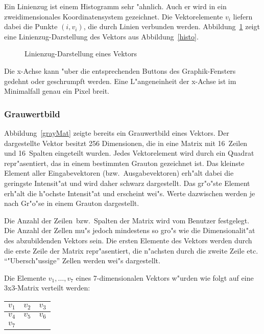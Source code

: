 Ein Linienzug ist einem Histogramm sehr "ahnlich. 
Auch er wird in ein zweidimensionales Koordinatensystem gezeichnet.
Die Vektorelemente $v_{i}$ liefern dabei die Punkte $(i,v_{i})$, die
durch Linien verbunden werden.
Abbildung~\ref{poly} zeigt eine Linienzug-Darstellung des Vektors aus
Abbildung~\ref{histo}.

\begin{figure}[ht]
\centerline{}
\caption{\label{poly} Linienzug-Darstellung eines Vektors}
\end{figure} 

Die x-Achse kann "uber die entsprechenden Buttons des Graphik-Fensters
gedehnt oder geschrumpft werden.
Eine L"angeneinheit der x-Achse ist im Minimalfall genau ein Pixel breit. 

\subsubsection*{Grauwertbild}

Abbildung~\ref{grayMat} zeigte bereits ein Grauwertbild eines Vektors.
Der dargestellte Vektor besitzt 256 Dimensionen, die in eine Matrix
mit 16~Zeilen und 16~Spalten eingeteilt wurden.
Jedes Vektorelement wird durch ein Quadrat repr"asentiert, das in einem
bestimmten Grauton gezeichnet ist.
Das kleinste Element aller Eingabevektoren (bzw.~Ausgabevektoren)
erh"alt dabei die geringste Intensit"at und wird daher schwarz dargestellt.
Das gr"o"ste Element erh"alt die h"ochste Intensit"at und erscheint wei"s.
Werte dazwischen werden je nach Gr"o"se in einem Grauton dargestellt. 

Die Anzahl der Zeilen~bzw.~Spalten der Matrix wird vom Benutzer festgelegt. 
Die Anzahl der Zellen mu"s jedoch mindestens so gro"s wie die Dimensionalit"at
des abzubildenden Vektors sein.
Die ersten Elemente des Vektors werden durch die erste Zeile der Matrix
repr"asentiert, die n"achsten durch die zweite Zeile etc.
"`"Ubersch"ussige"' Zellen werden wei"s dargestellt. 

Die Elemente $v_{1}, \ldots, v_{7}$ eines 7-dimensionalen Vektors w"urden
wie folgt auf eine 3x3-Matrix verteilt werden:

\hspace*{2cm}
\begin{tabular}{|c|c|c|}
\hline $v_{1}$ & $v_{2}$ & $v_{3}$ \\
\hline $v_{4}$ & $v_{5}$ & $v_{6}$ \\
\hline $v_{7}$ & & \\ \hline
\end{tabular}    
 
